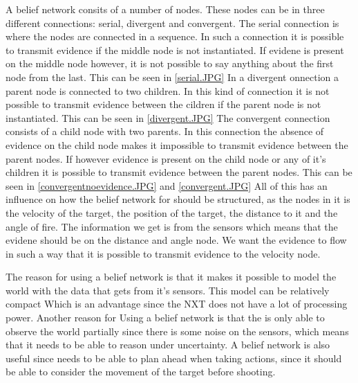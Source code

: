  A belief network consits of a number of nodes. These nodes can be in three
 different connections: serial, divergent and convergent. The serial
 connection is where the nodes are connected in a sequence. In such a connection
 it is possible to transmit evidence if the middle node is not instantiated. If
 evidene is present on the middle node however, it is not possible to say
 anything about the first node from the last. This can be seen in
 \autoref{serial.JPG}
 In a divergent onnection a parent node is connected to two children. In this
 kind of connection it is not possible to transmit evidence between the cildren
 if the parent node is not instantiated. This can be seen in
 \autoref{divergent.JPG}
 The convergent connection  consists of a child node with two parents. In this
 connection the absence of evidence on the child node makes it impossible to
 transmit evidence between the parent nodes. If however evidence is present on
 the child node or any of it's children it is possible to transmit evidence
 between the parent nodes. This can be seen in
 \autoref{convergentnoevidence.JPG} and \autoref{convergent.JPG}
 All of this has an influence on how the belief network for \name should be
 structured, as the nodes in it is the velocity of the target, the position of
 the target, the distance to it and the angle of fire. The information we get is
 from the sensors which means that the evidene should be on the distance and
 angle node. We want the evidence to flow in such a way that it is possible to
 transmit evidence to the velocity node.\nl
 
 The reason for using a belief network is that it makes it possible to model the
 world with the data that \name gets from it's sensors. This model can be
 relatively compact Which is an advantage since the NXT does not have a lot of
 processing power. Another reason for Using a belief network is that the \name
 is only able to observe the world partially since there is some noise on the
 sensors, which means that it needs to be able to reason under uncertainty.
 A belief network is also useful since \name needs to be able to plan
 ahead when taking actions, since it should be able to consider the movement of
 the target before shooting.
 
